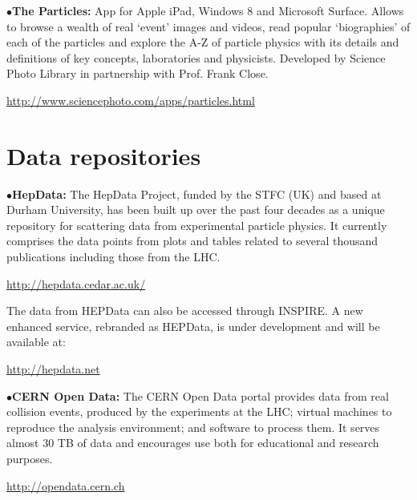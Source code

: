 \medskip

\item{$\bullet$}{\bf The Particles:}
App for Apple iPad, Windows 8 and Microsoft Surface. Allows to browse a wealth of real ‘event’ images and videos, read popular ‘biographies’ of each of the particles and explore the A-Z of particle physics with its details and definitions of key concepts, laboratories and physicists. Developed by Science Photo Library in partnership with Prof. Frank Close.
	\item{}\qquad\url{http://www.sciencephoto.com/apps/particles.html}

\medskip

\section{Data repositories}  %

\medskip


\medskip


\item{$\bullet$}{\bf HepData:} 
The HepData Project, funded by the STFC (UK) and based at Durham University, has been built up over the past four decades as a unique repository for scattering data from experimental particle physics.
It currently comprises the data points from plots and tables related to several thousand publications including those from the LHC.

	\item{}\qquad\url{http://hepdata.cedar.ac.uk/}
\medskip

\item{}The data from HEPData can also be accessed through INSPIRE. A new enhanced service, rebranded as HEPData, is under development and will be available at:

	\item{}\qquad\url{http://hepdata.net}
\medskip

\item{$\bullet$}{\bf CERN Open Data:} 
The CERN Open Data portal provides data from real collision events, produced by the experiments at the LHC; virtual machines to reproduce the analysis environment; and software to process them. It serves almost 30 TB of data and encourages use both for educational and research purposes.

	\item{}\qquad\url{http://opendata.cern.ch}
\medskip




